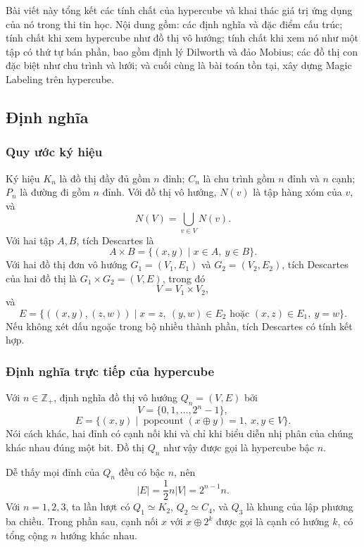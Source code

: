 \documentclass[11pt]{article}
\begin{document}
Bài viết này tổng kết các tính chất của hypercube và khai thác giá trị ứng
dụng của nó trong thi tin học. Nội dung gồm: các định nghĩa và đặc điểm cấu
trúc; tính chất khi xem hypercube như đồ thị vô hướng; tính chất khi xem nó như
một tập có thứ tự bán phần, bao gồm định lý Dilworth và đảo Mobius; các đồ thị
con đặc biệt như chu trình và lưới; và cuối cùng là bài toán tồn tại, xây dựng
Magic Labeling trên hypercube.

\subsection{Định nghĩa}

\subsubsection{Quy ước ký hiệu}

Ký hiệu \(K_n\) là đồ thị đầy đủ gồm \(n\) đỉnh; \(C_n\) là chu trình gồm
\(n\) đỉnh và \(n\) cạnh; \(P_n\) là đường đi gồm \(n\) đỉnh. Với đồ thị vô
hướng, \(N(v)\) là tập hàng xóm của \(v\), và
\[
  N(V)=\bigcup_{v\in V} N(v).
\]
Với hai tập \(A,B\), tích Descartes là
\[
  A\times B=\{(x,y)\mid x\in A,\ y\in B\}.
\]
Với hai đồ thị đơn vô hướng \(G_1=(V_1,E_1)\) và \(G_2=(V_2,E_2)\), tích
Descartes của hai đồ thị là \(G_1\times G_2=(V,E)\), trong đó
\[
  V=V_1\times V_2,
\]
và
\[
  E=\{((x,y),(z,w))\mid x=z,\ (y,w)\in E_2
  \text{ hoặc } (x,z)\in E_1,\ y=w\}.
\]
Nếu không xét dấu ngoặc trong bộ nhiều thành phần, tích Descartes có tính kết
hợp.

\subsubsection{Định nghĩa trực tiếp của hypercube}

Với \(n\in\mathbb Z_+\), định nghĩa đồ thị vô hướng \(Q_n=(V,E)\) bởi
\[
  V=\{0,1,\ldots,2^n-1\},
\]
\[
  E=\{(x,y)\mid \operatorname{popcount}(x\oplus y)=1,\ x,y\in V\}.
\]
Nói cách khác, hai đỉnh có cạnh nối khi và chỉ khi biểu diễn nhị phân của
chúng khác nhau đúng một bit. Đồ thị \(Q_n\) như vậy được gọi là hypercube bậc
\(n\).

Dễ thấy mọi đỉnh của \(Q_n\) đều có bậc \(n\), nên
\[
  |E|=\frac12 n|V|=2^{n-1}n.
\]
Với \(n=1,2,3\), ta lần lượt có \(Q_1\simeq K_2\), \(Q_2\simeq C_4\), và
\(Q_3\) là khung của lập phương ba chiều. Trong phần sau, cạnh nối \(x\) với
\(x\oplus 2^k\) được gọi là cạnh có hướng \(k\), có tổng cộng \(n\) hướng khác
nhau.
\end{document}
